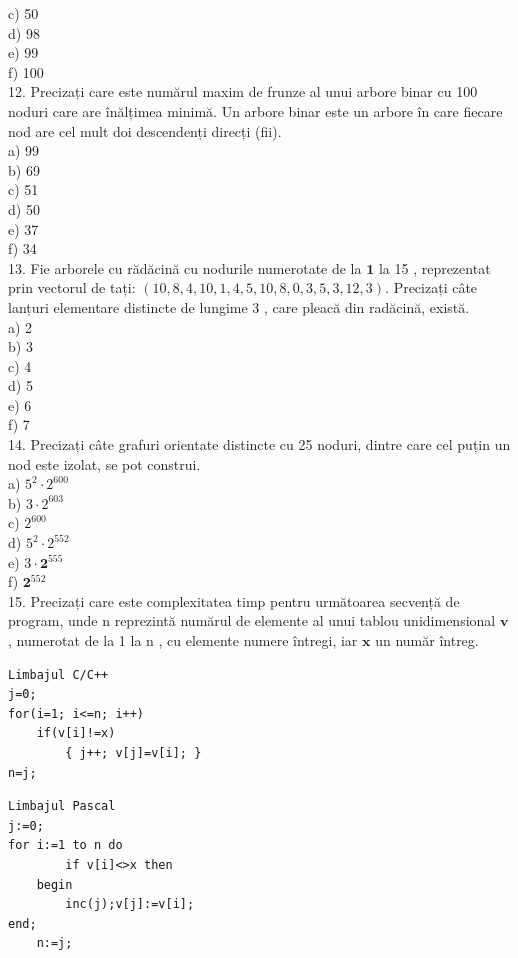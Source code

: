 \documentclass[10pt]{article}
\begin{document}
c) 50\\
d) 98\\
e) 99\\
f) 100\\
12. Precizați care este numărul maxim de frunze al unui arbore binar cu 100 noduri care are înălțimea minimă. Un arbore binar este un arbore în care fiecare nod are cel mult doi descendenți direcți (fii).\\
a) 99\\
b) 69\\
c) 51\\
d) 50\\
e) 37\\
f) 34\\
13. Fie arborele cu rădăcină cu nodurile numerotate de la $\mathbf{1}$ la 15 , reprezentat prin vectorul de tați: $(10,8,4,10,1,4,5,10,8,0,3,5,3,12,3)$. Precizați câte lanțuri elementare distincte de lungime 3 , care pleacă din radăcină, există.\\
a) 2\\
b) 3\\
c) 4\\
d) 5\\
e) 6\\
f) 7\\
14. Precizați câte grafuri orientate distincte cu 25 noduri, dintre care cel puțin un nod este izolat, se pot construi.\\
a) $5^{2} \cdot 2^{600}$\\
b) $3 \cdot 2^{603}$\\
c) $2^{600}$\\
d) $5^{2} \cdot 2^{552}$\\
e) $3 \cdot \mathbf{2}^{555}$\\
f) $\mathbf{2}^{552}$\\
15. Precizați care este complexitatea timp pentru următoarea secvență de program, unde n reprezintă numărul de elemente al unui tablou unidimensional $\mathbf{v}$, numerotat de la 1 la n , cu elemente numere întregi, iar $\mathbf{x}$ un număr întreg.

\begin{verbatim}
Limbajul C/C++
j=0;
for(i=1; i<=n; i++)
    if(v[i]!=x)
        { j++; v[j]=v[i]; }
n=j;
\end{verbatim}

\begin{verbatim}
Limbajul Pascal
j:=0;
for i:=1 to n do
        if v[i]<>x then
    begin
        inc(j);v[j]:=v[i];
end;
    n:=j;
\end{verbatim}
\end{document}
